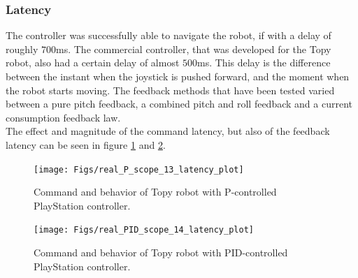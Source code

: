 \subsubsection{Latency}
The controller was successfully able to navigate the robot, if with a delay of roughly $700$ms. The commercial controller, that was developed for the Topy robot, also had a certain delay of almost $500$ms. This delay is the difference between the instant when the joystick is pushed forward, and the moment when the robot starts moving. The feedback methods that have been tested varied between a pure pitch feedback, a combined pitch and roll feedback and a current consumption feedback law. \\
The effect and magnitude of the command latency, but also of the feedback latency can be seen in figure \ref{fig:real_P_scope_13_latency_plot} and \ref{fig:real_PID_scope_14_latency_plot}.

\begin{figure}[h!]
	\centering
	\texttt{[image: Figs/real\_P\_scope\_13\_latency\_plot]}
	\caption{Command and behavior of Topy robot with P-controlled PlayStation controller.}
	\label{fig:real_P_scope_13_latency_plot}
\end{figure}


\begin{figure}[h!]
	\centering
	\texttt{[image: Figs/real\_PID\_scope\_14\_latency\_plot]}
	\caption{Command and behavior of Topy robot with PID-controlled PlayStation controller.}
	\label{fig:real_PID_scope_14_latency_plot}
\end{figure}



